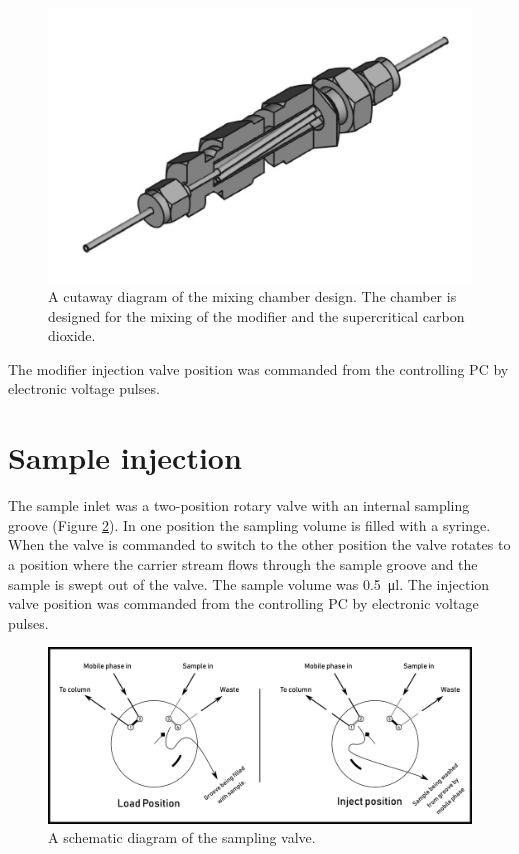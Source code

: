 \begin{figure}
\centering
\includegraphics[width=\textwidth]{Figures/MixingChamber.png}
\decoRule

\caption[A cutaway diagram of the mixing chamber]{A cutaway diagram of the
mixing chamber design. The chamber is designed for the mixing of the modifier
and the supercritical carbon dioxide.}

\label{fig:mixingchamber}
\end{figure}

The modifier injection valve position was commanded from the controlling PC by electronic
voltage pulses.

\section{Sample injection}
\label{sec:SFCInjection}

The sample inlet was a two-position rotary valve with an internal sampling
groove (Figure \ref{fig:samplingvalve}). In one position the sampling volume is
filled with a syringe. When the valve is commanded to switch to the other
position the valve rotates to a position where the carrier stream flows through
the sample groove and the sample is swept out of the valve. The sample volume
was \SI{0.5}{\micro\litre}. The injection valve position was commanded from the
controlling PC by electronic voltage pulses.

\begin{figure}
\centering
\includegraphics[width=\textwidth]{Figures/SampleValve.pdf}
\decoRule

\caption[Schematic diagram of the injection valve.]{A schematic diagram of the sampling valve. }

\label{fig:samplingvalve}
\end{figure}

